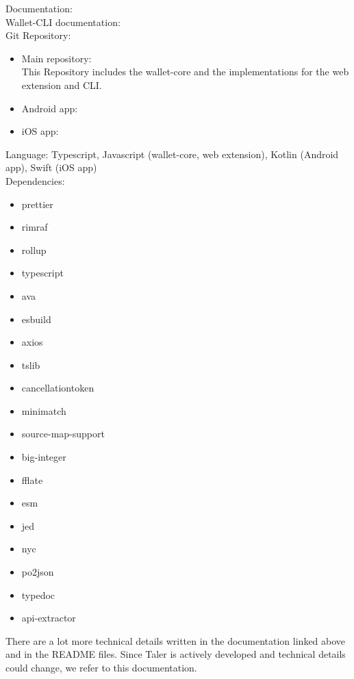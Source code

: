 Documentation: \cite{taler-documentation:wallet-developer-manual} \\
Wallet-CLI documentation: \cite{taler-documentation:wallet-cli-manual} \\
Git Repository: 
\begin{itemize}
    \item Main repository: \cite{taler-git:wallet-core} \\
    This Repository includes the wallet-core and the implementations for the web extension and CLI.
    \item Android app: \cite{taler-git:android}
    \item iOS app: \cite{taler-git:ios}
\end{itemize}
Language: Typescript, Javascript (wallet-core,  web extension), Kotlin (Android app), Swift (iOS app)\\
Dependencies: 
\begin{itemize}
    \item prettier            
    \item rimraf
    \item rollup
    \item typescript
    \item ava
    \item esbuild
    \item axios
    \item tslib
    \item cancellationtoken
    \item minimatch
    \item source-map-support
    \item big-integer
    \item fflate
    \item esm
    \item jed
    \item nyc
    \item po2json
    \item typedoc
    \item api-extractor
\end{itemize}

There are a lot more technical details written in the documentation linked above and in the README files.
Since Taler is actively developed and technical details could change, we refer to this documentation.



